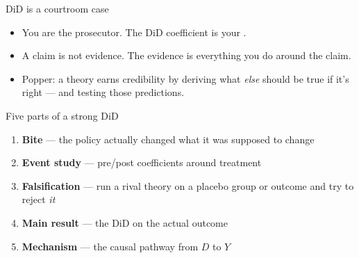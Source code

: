 \documentclass[aspectratio=169,11pt]{beamer}
\begin{document}

\begin{frame}{DiD is a courtroom case}
\vspace{0.8em}
\vspace{0.6em}
\begin{itemize}
  \item You are the prosecutor. The DiD coefficient is your .
  \item A claim is not evidence. The evidence is everything you do around the claim.
  \item Popper: a theory earns credibility by deriving what \textit{else} should be true if it's right --- and testing those predictions.
\end{itemize}
\end{frame}

\begin{frame}{Five parts of a strong DiD}
\vspace{0.6em}
\begin{enumerate}
  \item \textbf{\color{accent}Bite} --- the policy actually changed what it was supposed to change
  \item \textbf{\color{accent}Event study} --- pre/post coefficients around treatment
  \item \textbf{\color{accent}Falsification} --- run a rival theory on a placebo group or outcome and try to reject \textit{it}
  \item \textbf{\color{accent}Main result} --- the DiD on the actual outcome
  \item \textbf{\color{accent}Mechanism} --- the causal pathway from $D$ to $Y$
\end{enumerate}
\vspace{0.5em}
\end{frame}
\end{document}
